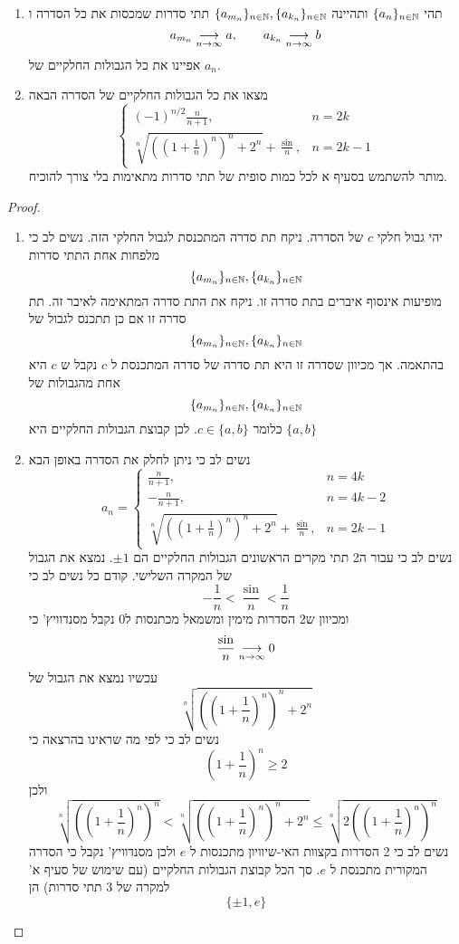 \documentclass{article}
\begin{document}
\newpage

\begin{exercise}
\begin{enumerate}
\item 
תהי 
$\{a_n\}_{n\in\mathbb{N}}$
ותהיינה 
$\{a_{m_n}\}_{n\in\mathbb{N}}, \{a_{k_n}\}_{n\in\mathbb{N}}$
תתי סדרות שמכסות את כל הסדרה ו 
\[a_{m_n}\underset{n\rightarrow\infty}{\longrightarrow} a, \quad\quad a_{k_n}\underset{n\rightarrow\infty}{\longrightarrow} b\]
אפיינו את כל הגבולות החלקיים של 
$a_n$.
\item 
מצאו את כל הגבולות החלקיים של הסדרה הבאה 
\[\begin{cases}(-1)^{n/2}\frac{n}{n+1}, & n=2k \\ \sqrt[n]{\left(\left(1+\frac{1}{n}\right)^n\right)^n + 2^n}+\frac{\sin}{n}, & n=2k-1\end{cases}\]
מותר להשתמש בסעיף א לכל כמות סופית של תתי סדרות מתאימות בלי צורך להוכיח.
\end{enumerate}
\end{exercise}

\begin{proof}
\begin{enumerate}
\item 
יהי גבול חלקי 
$c$
של הסדרה. ניקח תת סדרה המתכנסת לגבול החלקי הזה. נשים לב כי מלפחות אחת התתי סדרות 
\[\{a_{m_n}\}_{n\in\mathbb{N}}, \{a_{k_n}\}_{n\in\mathbb{N}}\]
מופיעות אינסוף איברים בתת סדרה זו. ניקח את התת סדרה המתאימה לאיבר זה. תת סדרה זו אם כן תתכנס לגבול של
\[\{a_{m_n}\}_{n\in\mathbb{N}}, \{a_{k_n}\}_{n\in\mathbb{N}}\]
בהתאמה. אך מכיוון שסדרה זו היא תת סדרה של סדרה המתכנסת ל
$c$
נקבל ש 
$c$
היא אחת מהגבולות של 
\[\{a_{m_n}\}_{n\in\mathbb{N}}, \{a_{k_n}\}_{n\in\mathbb{N}}\]
כלומר 
$c\in\{a, b\}$. 
לכן קבוצת הגבולות החלקיים היא 
$\{a, b\}$
\item 
נשים לב כי ניתן לחלק את הסדרה באופן הבא
\[a_n = \begin{cases}\frac{n}{n+1}, & n=4k \\ -\frac{n}{n+1}, & n=4k-2 \\ \sqrt[n]{\left(\left(1+\frac{1}{n}\right)^n\right)^n + 2^n}+\frac{\sin}{n}, & n=2k-1\end{cases}\]
נשים לב כי עבור ה2 תתי מקרים הראשונים הגבולות החלקיים הם 
$\pm 1$. 
נמצא את הגבול של המקרה השלישי. קודם כל נשים לב כי 
\[-\frac{1}{n}<\frac{\sin}{n}<\frac{1}{n}\]
ומכיוון ש2 הסדרות מימין ומשמאל מכתנסות ל0 נקבל מסנדוויץ' כי 
\[\frac{\sin}{n}\underset{n\rightarrow\infty}{\longrightarrow} 0\]
עכשיו נמצא את הגבול של 
\[\sqrt[n]{\left(\left(1+\frac{1}{n}\right)^n\right)^n + 2^n}\]
נשים לב כי לפי מה שראינו בהרצאה כי
\[\left(1+\frac{1}{n}\right)^n \geq 2\]
ולכן 
\[\sqrt[n]{\left(\left(1+\frac{1}{n}\right)^n\right)^n}<\sqrt[n]{\left(\left(1+\frac{1}{n}\right)^n\right)^n + 2^n} \leq \sqrt[n]{2\left(\left(1+\frac{1}{n}\right)^n\right)^n}\]
נשים לב כי 2 הסדרות בקצוות האי-שיוויון מתכנסות ל 
$e$
ולכן מסנדוויץ' נקבל כי הסדרה המקורית מתכנסת ל 
$e$.
סך הכל קבוצת הגבולות החלקיים (עם שימוש של סעיף א' למקרה של 3 תתי סדרות) הן 
\[\{\pm 1, e\}\]
\end{enumerate}
\end{proof}
\end{document}
